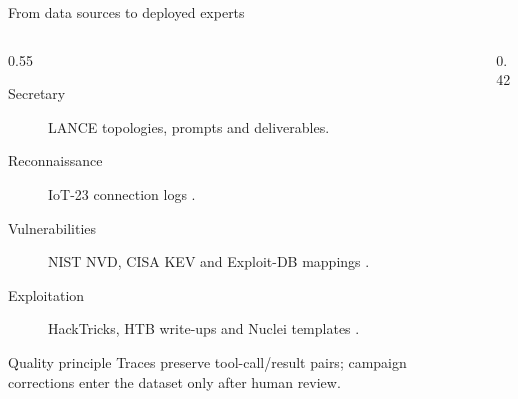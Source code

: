 \documentclass[aspectratio=169,10pt]{beamer}
\begin{document}
\begin{frame}{From data sources to deployed experts}
  \begin{columns}[T,onlytextwidth]
    \begin{column}{0.55\textwidth}
      \small
      \begin{description}
        \item[Secretary] LANCE topologies, prompts and deliverables.
        \item[Reconnaissance] IoT-23 connection logs
          \cite{garcia2020iot23}.
        \item[Vulnerabilities] NIST NVD, CISA KEV and Exploit-DB mappings
          \cite{nistnvdapi,cisakev,offsecexploitdb}.
        \item[Exploitation] HackTricks, HTB write-ups and Nuclei templates
          \cite{hacktricksrepo,momenbaselhtb,zweilosechtb,nucleitemplates}.
      \end{description}
      \begin{alertblock}{Quality principle}
        Traces preserve tool-call/result pairs; campaign corrections enter the
        dataset only after human review.
      \end{alertblock}
    \end{column}
    \begin{column}{0.42\textwidth}
      \centering
    \end{column}
  \end{columns}
\end{frame}
\end{document}
